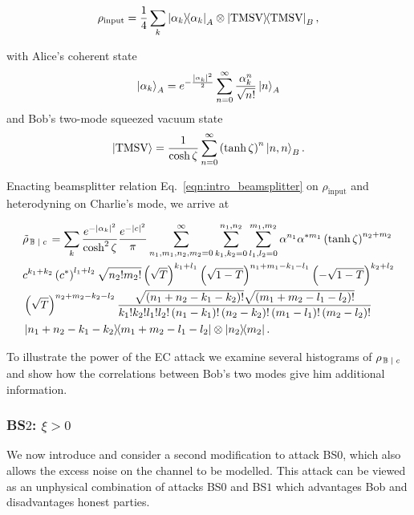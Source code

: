 \begin{equation}
\rho_{\text{input}} = \frac{1}{4}\sum_k \dyad{\alpha_k}_A \otimes \dyad{\text{TMSV}}_B,
\end{equation}

\noindent with Alice's coherent state
\begin{equation}
\ket{\alpha_k}_A = e^{- \frac{\left| \alpha_k \right|^2}{2}} \sum_{n=0}^\infty \frac{\alpha_k^n}{\sqrt{n!}} \ket{n}_A
\end{equation}
and Bob's two-mode squeezed vacuum state
\begin{equation}
\ket{\text{TMSV}} = \frac{1}{\cosh{\zeta}}\sum_{n=0}^\infty \left(\tanh{\zeta}\right)^n \ket{n, n}_B.
\end{equation}

\noindent Enacting beamsplitter relation Eq.~\ref{eqn:intro_beamsplitter} on $\rho_{\text{input}}$ and heterodyning on Charlie's mode, we arrive at 

\begin{align}\label{eqn:appendix_ec_state}
&\tilde{\rho}_{\left. \mathbb{B} \given c\right.} = \sum_k\frac{e^{- \left|\alpha_k\right|^2}}{\cosh^2 \zeta}\frac{e^{-\left|c\right|^2}}{\pi} \sum_{n_1, m_1, n_2, m_2=0}^\infty \sum_{k_1, k_2 = 0}^{n_1, n_2} \sum_{l_1, l_2 = 0}^{m_1, m_2} \alpha^{n_1} \alpha^{* m_1} \left(\tanh{\zeta}\right)^{n_2 + m_2} \notag \\
%
&c^{k_1 + k_2} \left(c^*\right)^{l_1 + l_2} \sqrt{n_2! m_2!} \left(\sqrt{T}\right)^{k_1 + l_1} \left(\sqrt{1-T}\right)^{n_1 + m_1 - k_1 - l_1} \left(- \sqrt{1-T}\right)^{k_2 + l_2} \notag \\ %
&\left( \sqrt{T}\right)^{n_2 + m_2 - k_2 - l_2}
\frac{\sqrt{\left(n_1 + n_2 - k_1 - k_2\right)!} \sqrt{\left(m_1 + m_2 - l_1 - l_2\right)!}}{k_1! k_2! l_1! l_2! \left(n_1 - k_1\right)! \left(n_2 - k_2\right)! \left(m_1 - l_1\right)! \left(m_2 - l_2\right)!} \notag \\
%
& \dyad{n_1 + n_2 - k_1 - k_2}{m_1 + m_2 - l_1 - l_2}\otimes \dyad{n_2}{m_2}.
\end{align}

To illustrate the power of the EC attack we examine several histograms of $\rho_{\left. \mathbb{B} \; \middle| \; c\right.}$ and show how the correlations between Bob's two modes give him additional information. 


\subsubsection{BS$2$: $\xi > 0$}\label{sec:qds_bs2}
We now introduce and consider a second modification to attack BS$0$, which also allows the excess noise on the channel to be modelled. This attack can be viewed as an unphysical combination of attacks BS$0$ and BS$1$ which advantages Bob and disadvantages honest parties.

